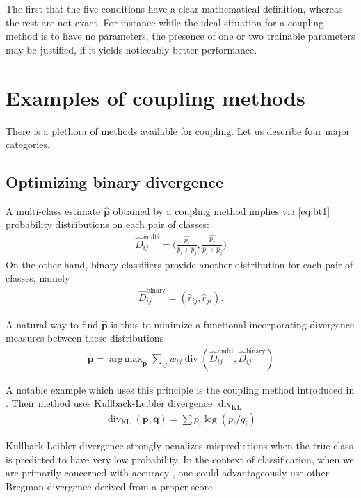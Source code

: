 \documentclass[twoside,11pt]{article}
\DeclareMathOperator*{\divm}{div}
\DeclareMathOperator*{\argmax}{arg\,max}
\begin{document}
The first that the five conditions have a clear mathematical definition, whereas the rest are not exact. For instance while the ideal situation for a coupling method is to have no parameters, the presence of one or two trainable parameters may be justified, if it yields noticeably better performance.


\section{Examples of coupling methods} \label{sec:coupling}

There is a plethora of methods available for coupling. Let us describe four major categories.




\subsection{Optimizing binary divergence}

A multi-class estimate $\hat{\boldsymbol{p}}$ obtained by a coupling method implies via \eqref{eq:bt1} probability distributions on each pair of classes:
\begin{align*}
	\hat D_{ij}^\textrm{multi}= \biggl(\frac{\hat{p_i}}{\hat p_i + \hat p_j},\frac{\hat{p_j}}{\hat p_i + \hat p_j}\biggr)	
\end{align*}
On the other hand, binary classifiers provide another distribution for each pair of  classes, namely
\begin{align*}
\hat D_{ij}^\textrm{binary} = (\hat r_{ij}, \hat r_{ji}).
\end{align*}

A natural way to find  $\hat{\boldsymbol{p}}$ is thus to minimize a functional incorporating divergence measures between these distributions
\begin{align*}
\hat{\boldsymbol{p}} = \argmax_{\boldsymbol{p}} \sum_{ij} w_{ij} \divm (\hat D_{ij}^\textrm{multi}, \hat D_{ij}^\textrm{binary})
\end{align*}

A notable example which uses this principle is the coupling method introduced in \cite{hastie1998classification}. Their method uses Kullback-Leibler divergence $\divm_\textrm{KL}$
\begin{align*}
	\divm\nolimits_\textrm{KL} (\boldsymbol{p}, \boldsymbol{q})= \sum p_i \log (p_i/ q_i)
\end{align*}

Kullback-Leibler divergence strongly penalizes  mispredictions when the true class is predicted to have very low probability. In the context of classification, when we are primarily concerned with accuracy , one could advantageously use other Bregman divergence derived from a proper score.
 
\end{document}
